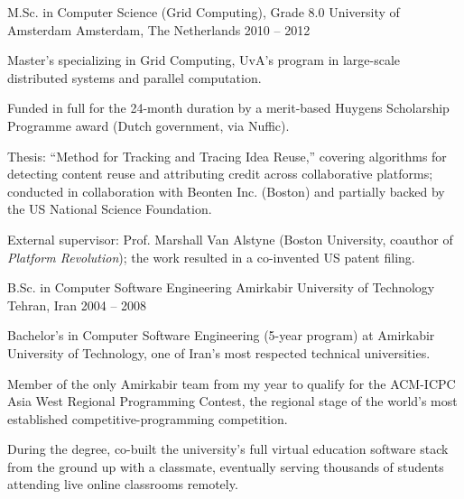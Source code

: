 

\begin{cventries}

  \cventry
    {M.Sc. in Computer Science (Grid Computing), Grade 8.0} %
    {University of Amsterdam} %
    {Amsterdam, The Netherlands} %
    {2010 -- 2012} %
    {
      \begin{cvitems} %
        \item {Master's specializing in Grid Computing, UvA's program in large-scale distributed systems and parallel computation.}
        \item {Funded in full for the 24-month duration by a merit-based Huygens Scholarship Programme award (Dutch government, via Nuffic).}
        \item {Thesis: ``Method for Tracking and Tracing Idea Reuse,'' covering algorithms for detecting content reuse and attributing credit across collaborative platforms; conducted in collaboration with Beonten Inc. (Boston) and partially backed by the US National Science Foundation.}
        \item {External supervisor: Prof. Marshall Van Alstyne (Boston University, coauthor of \emph{Platform Revolution}); the work resulted in a co-invented US patent filing.}
      \end{cvitems}
    }

  \cventry
    {B.Sc. in Computer Software Engineering} %
    {Amirkabir University of Technology} %
    {Tehran, Iran} %
    {2004 -- 2008} %
    {
      \begin{cvitems} %
        \item {Bachelor's in Computer Software Engineering (5-year program) at Amirkabir University of Technology, one of Iran's most respected technical universities.}
        \item {Member of the only Amirkabir team from my year to qualify for the ACM-ICPC Asia West Regional Programming Contest, the regional stage of the world's most established competitive-programming competition.}
        \item {During the degree, co-built the university's full virtual education software stack from the ground up with a classmate, eventually serving thousands of students attending live online classrooms remotely.}
      \end{cvitems}
    }

\end{cventries}
